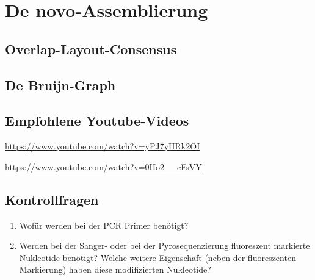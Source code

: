 \section{De novo-Assemblierung}

\subsection{Overlap-Layout-Consensus}

\subsection{De Bruijn-Graph}

\subsection{Empfohlene Youtube-Videos}
\begin{description}[align=left]
	\item [Overlap-Graph] \href{https://www.youtube.com/watch?v=yPJ7yHRk2OI}{https://www.youtube.com/watch?v=yPJ7yHRk2OI}
	\item [Contigs] \href{https://www.youtube.com/watch?v=0Ho2\_\_cFsVY}{https://www.youtube.com/watch?v=0Ho2\_\_cFsVY}
\end{description}

\subsection{Kontrollfragen}
\begin{enumerate}
	\item Wofür werden bei der PCR Primer benötigt?
	\item Werden bei der Sanger- oder bei der Pyrosequenzierung fluoreszent markierte Nukleotide benötigt? Welche weitere Eigenschaft (neben der fluoreszenten Markierung) haben diese modifizierten Nukleotide?
\end{enumerate}
